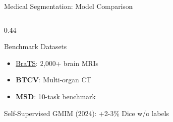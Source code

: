 \documentclass[aspectratio=169,xcolor=dvipsnames]{beamer}
\begin{document}
\begin{frame}{Medical Segmentation: Model Comparison}
\begin{columns}
\begin{column}{0.44\textwidth}
            \begin{block}{Benchmark Datasets}
                \small
                \begin{itemize}\setlength{\itemsep}{1pt}
                    \item \href{https://www.synapse.org/brats}{BraTS}: 2,000+ brain MRIs
                    \item \textbf{BTCV}: Multi-organ CT
                    \item \textbf{MSD}: 10-task benchmark
                \end{itemize}
            \end{block}
            
            \begin{alertblock}{\small Self-Supervised}
                \scriptsize GMIM (2024): +2-3\% Dice w/o labels
            \end{alertblock}
        \end{column}
    \end{columns}
\end{frame}
\end{document}
